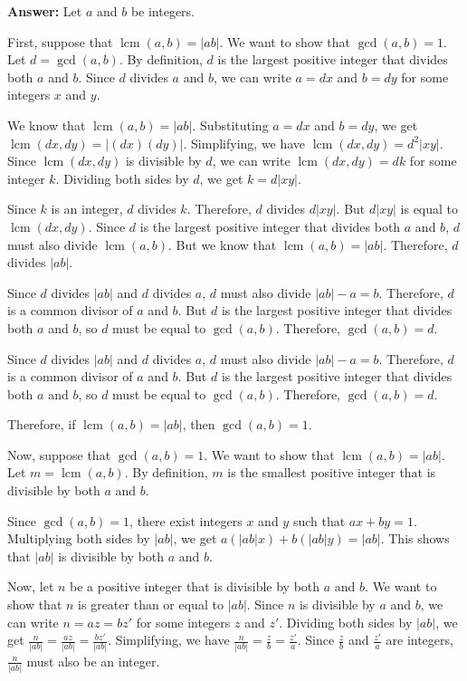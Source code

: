 \documentclass[12pt,reqno]{amsart}
\newcommand{\lcm}{\operatorname{lcm}}
\begin{document}
\begin{enumerate}
\textbf{Answer:} Let $a$ and $b$ be integers.

First, suppose that $\lcm(a,b) = |ab|$. We want to show that $\gcd(a,b) = 1$. Let $d = \gcd(a,b)$. By definition, $d$ is the largest positive integer that divides both $a$ and $b$. Since $d$ divides $a$ and $b$, we can write $a = dx$ and $b = dy$ for some integers $x$ and $y$. 

We know that $\lcm(a,b) = |ab|$. Substituting $a = dx$ and $b = dy$, we get $\lcm(dx, dy) = |(dx)(dy)|$. Simplifying, we have $\lcm(dx, dy) = d^2|xy|$. Since $\lcm(dx, dy)$ is divisible by $d$, we can write $\lcm(dx, dy) = dk$ for some integer $k$. Dividing both sides by $d$, we get $k = d|xy|$. 

Since $k$ is an integer, $d$ divides $k$. Therefore, $d$ divides $d|xy|$. But $d|xy|$ is equal to $\lcm(dx, dy)$. Since $d$ is the largest positive integer that divides both $a$ and $b$, $d$ must also divide $\lcm(a,b)$. But we know that $\lcm(a,b) = |ab|$. Therefore, $d$ divides $|ab|$. 

Since $d$ divides $|ab|$ and $d$ divides $a$, $d$ must also divide $|ab| - a = b$. Therefore, $d$ is a common divisor of $a$ and $b$. But $d$ is the largest positive integer that divides both $a$ and $b$, so $d$ must be equal to $\gcd(a,b)$. Therefore, $\gcd(a,b) = d$. 

Since $d$ divides $|ab|$ and $d$ divides $a$, $d$ must also divide $|ab| - a = b$. Therefore, $d$ is a common divisor of $a$ and $b$. But $d$ is the largest positive integer that divides both $a$ and $b$, so $d$ must be equal to $\gcd(a,b)$. Therefore, $\gcd(a,b) = d$. 

Therefore, if $\lcm(a,b) = |ab|$, then $\gcd(a,b) = 1$.

Now, suppose that $\gcd(a,b) = 1$. We want to show that $\lcm(a,b) = |ab|$. Let $m = \lcm(a,b)$. By definition, $m$ is the smallest positive integer that is divisible by both $a$ and $b$. 

Since $\gcd(a,b) = 1$, there exist integers $x$ and $y$ such that $ax + by = 1$. Multiplying both sides by $|ab|$, we get $a(|ab|x) + b(|ab|y) = |ab|$. This shows that $|ab|$ is divisible by both $a$ and $b$. 

Now, let $n$ be a positive integer that is divisible by both $a$ and $b$. We want to show that $n$ is greater than or equal to $|ab|$. Since $n$ is divisible by $a$ and $b$, we can write $n = az = bz'$ for some integers $z$ and $z'$. Dividing both sides by $|ab|$, we get $\frac{n}{|ab|} = \frac{az}{|ab|} = \frac{bz'}{|ab|}$. Simplifying, we have $\frac{n}{|ab|} = \frac{z}{b} = \frac{z'}{a}$. Since $\frac{z}{b}$ and $\frac{z'}{a}$ are integers, $\frac{n}{|ab|}$ must also be an integer. 


\end{enumerate}
\end{document}
